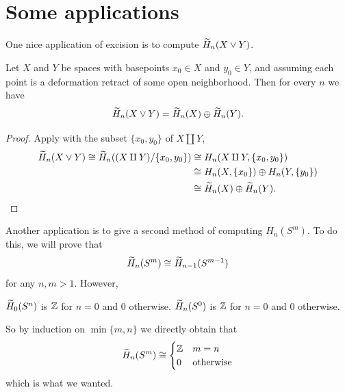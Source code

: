 \section{Some applications}
One nice application of excision is to compute $\widetilde H_n(X \vee Y)$.
\begin{theorem}
	Let $X$ and $Y$ be spaces with basepoints $x_0 \in X$ and $y_0 \in Y$,
	and assuming each point is a deformation retract of some open neighborhood.
	Then for every $n$ we have
	\[
		\widetilde H_n(X \vee Y)
		= \widetilde H_n(X) \oplus \widetilde H_n(Y).
	\]
\end{theorem}
\begin{proof}
	Apply  with the subset $\{x_0, y_0\}$ of $X \amalg Y$,
	\begin{align*}
		\widetilde H_n (X \vee Y)
		\cong \widetilde H_n( (X \amalg Y) / \{x_0, y_0\} )
		&\cong H_n(X \amalg Y, \{x_0,y_0\}) \\
		&\cong H_n(X, \{x_0\}) \oplus H_n(Y, \{y_0\}) \\
		&\cong\widetilde H_n(X) \oplus \widetilde H_n(Y). \qedhere
	\end{align*}
\end{proof}

Another application is to give a second method
of computing $H_n(S^m)$.
To do this, we will prove that
\[ \widetilde H_n(S^m) \cong \widetilde H_{n-1}(S^{m-1}) \]
for any $n,m > 1$.
However,
\begin{itemize}
	\ii $\widetilde H_0(S^n)$ is $\mathbb Z$ for $n=0$ and $0$ otherwise.
	\ii $\widetilde H_n(S^0)$ is $\mathbb Z$ for $n=0$ and $0$ otherwise.
\end{itemize}
So by induction on $\min \{m,n\}$ we directly obtain that
\[
	\widetilde H_n(S^m) \cong
	\begin{cases}
		\mathbb Z & m=n \\
		0 & \text{otherwise}
	\end{cases}
\]
which is what we wanted.

